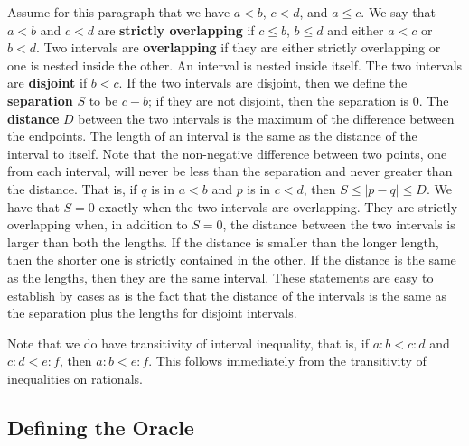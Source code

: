 \documentclass[12pt]{article}
\begin{document}
Assume for this paragraph that we have $a \lt b$, $c \lt d$, and $a \leq c$. We say that $a\lt b$ and $c \lt d$ are \textbf{strictly overlapping} if $c \leq b$, $b \leq d$ and either $a < c$ or $b < d$. Two intervals are \textbf{overlapping} if they are either strictly overlapping or one is nested inside the other. An interval is nested inside itself. The two intervals are \textbf{disjoint} if $b < c$. If the two intervals are disjoint, then we define the \textbf{separation} $S$ to be $c-b$; if they are not disjoint, then the separation is 0.  The \textbf{distance} $D$ between the two intervals is the maximum of the difference between the endpoints. The length of an interval is the same as the distance of the interval to itself. Note that the non-negative difference between two points, one from each interval, will never be less than the separation and never greater than the distance. That is, if $q$ is in $a\lt b$ and $p$ is in $c \lt d$, then $S \leq |p-q| \leq D$. We have that  $S = 0$ exactly when the two intervals are overlapping. They are strictly overlapping when, in addition to $S=0$,  the distance between the two intervals is larger than both the lengths. If the distance is smaller than the longer length, then the shorter one is strictly contained in the other. If the distance is the same as the lengths, then they are the same interval. These statements are easy to establish by cases as is the fact that the distance of the intervals is the same as the separation plus the lengths for disjoint intervals. 

Note that we do have transitivity of interval inequality, that is, if $a:b < c:d$ and $c:d < e:f$, then $a:b < e:f$. This follows immediately from the transitivity of inequalities on rationals.


\subsection{Defining the Oracle}
\end{document}
